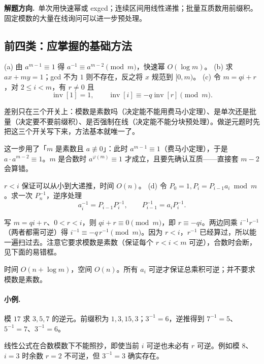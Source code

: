 \documentclass[UTF8,a4paper,11pt,twoside,openright,fontset=fandol]{ctexbook}
\theoremstyle{definition}
\newcommand{\hint}{\par\noindent\textbf{解题方向.}\ }
\begin{document}
\hint 单次用快速幂或 exgcd；连续区间用线性递推；批量互质数用前缀积。固定模数的大量在线询问可以进一步预处理。


\subsection{前四类：应掌握的基础方法}
(a) 由 $a^{m-1}\equiv1$ 得 $a^{-1}\equiv a^{m-2}\pmod m$，快速幂 $O(\log m)$。
(b) 求 $ax+my=1$；gcd 不为 $1$ 则不存在，反之将 $x$ 规范到 $[0,m)$。
(c) 令 $m=qi+r$，对 $2\le i<m$，有 $r\ne0$ 且
\[
 \operatorname{inv}[1]=1,\qquad
 \operatorname{inv}[i]\equiv-q\operatorname{inv}[r]\pmod m.
\]

\begin{tip}[为什么要分五类]
差别只在三个开关上：模数是素数吗（决定能不能用费马小定理）、是单次还是批量（决定要不要前缀积）、是否强制在线（决定能不能分块预处理）。做逆元题时先把这三个开关写下来，方法基本就唯一了。
\end{tip}

\begin{tip}
这一步用了「$m$ 是素数且 $a\not\equiv0$」：此时 $a^{m-1}\equiv1$（费马小定理），于是 $a\cdot a^{m-2}\equiv1$。$m$ 是合数时 $a^{\varphi(m)}\equiv1$ 才成立，且要先确认互质——直接套 $m-2$ 会算错。
\end{tip}

$r<i$ 保证可以从小到大递推，时间 $O(n)$。
(d) 令 $P_0=1,P_i=P_{i-1}a_i\bmod m$。求一次 $P_n^{-1}$，逆序处理
\[
 a_i^{-1}=P_{i-1}P_i^{-1},\qquad P_{i-1}^{-1}=a_iP_i^{-1}.
\]

\begin{tip}[线性递推逆元公式是怎么来的]
写 $m=qi+r$、$0<r<i$，则 $qi+r\equiv0\pmod m$，即 $r\equiv-qi$。两边同乘 $i^{-1}r^{-1}$（两者都需可逆）得 $i^{-1}\equiv-q\,r^{-1}\pmod m$。因为 $r<i$，$r^{-1}$ 已经算过，所以能一遍扫过去。注意它要求模数是素数（保证每个 $r<i<m$ 可逆），合数时会断，见下面的易错框。
\end{tip}

时间 $O(n+\log m)$，空间 $O(n)$。所有 $a_i$ 可逆才保证总乘积可逆；并不要求模数是素数。

\paragraph{小例.} 模 $17$ 求 $3,5,7$ 的逆元。前缀积为 $1,3,15,3$；$3^{-1}=6$，逆推得到 $7^{-1}=5$、$5^{-1}=7$、$3^{-1}=6$。

\begin{pitfall}
线性公式在合数模数下不能照抄，即使当前 $i$ 可逆也未必有 $r$ 可逆。例如模 $8$、$i=3$ 时余数 $r=2$ 不可逆，但 $3^{-1}=3$ 确实存在。
\end{pitfall}
\end{document}
